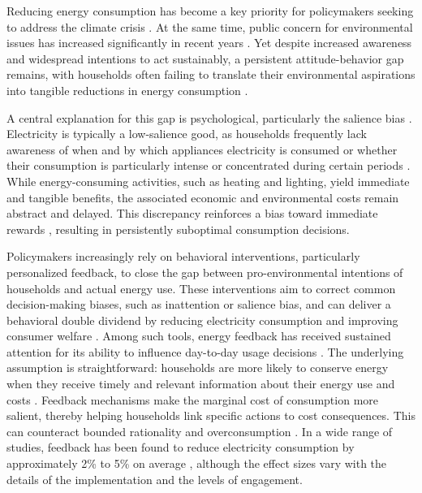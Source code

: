 
Reducing energy consumption has become a key priority for policymakers seeking to address the climate crisis \citep{shuklaClimateChange20222022}. At the same time, public concern for environmental issues has increased significantly in recent years \citep{andreGloballyRepresentativeEvidence2024,milfontTenyearPanelData2021}. Yet despite increased awareness and widespread intentions to act sustainably, a persistent attitude-behavior gap remains, with households often failing to translate their environmental aspirations into tangible reductions in energy consumption \citep{allcottRethinkingRealtimeElectricity2011,zhangExaminingAttitudebehaviorGap2021}.

A central explanation for this gap is psychological, particularly the salience bias \citep{chettySalienceTaxationTheory2009}. Electricity is typically a low-salience good, as households frequently lack awareness of when and by which appliances electricity is consumed or whether their consumption is particularly intense or concentrated during certain periods \citep{alcocerSalienceBiasFramework2024,jessoeKnowledgeLessPower2014,tiefenbeckRealtimeFeedbackPromotes2019}. While energy-consuming activities, such as heating and lighting, yield immediate and tangible benefits, the associated economic and environmental costs remain abstract and delayed. This discrepancy reinforces a bias toward immediate rewards \citep{kahnemanJudgmentUncertaintyHeuristics1982}, resulting in persistently suboptimal consumption decisions. 

Policymakers increasingly rely on behavioral interventions, particularly personalized feedback, to close the gap between pro-environmental intentions of households and actual energy use. These interventions aim to correct common decision-making biases, such as inattention or salience bias, and can deliver a behavioral double dividend by reducing electricity consumption and improving consumer welfare \citep{allcottShortrunLongrunEffects2014}. Among such tools, energy feedback has received sustained attention for its ability to influence day-to-day usage decisions \citep{agarwalReviewResidentialEnergy2023,khannaMulticountryMetaanalysisRole2021}. The underlying assumption is straightforward: households are more likely to conserve energy when they receive timely and relevant information about their energy use and costs \citep{jessoeKnowledgeLessPower2014}. Feedback mechanisms make the marginal cost of consumption more salient, thereby helping households link specific actions to cost consequences. This can counteract bounded rationality and overconsumption \citep{alcocerSalienceBiasFramework2024}.
In a wide range of studies, feedback has been found to reduce electricity consumption by approximately 2\% to 5\% on average \citep{delmasInformationStrategiesEnergy2013,khannaMulticountryMetaanalysisRole2021,mckerracherEnergyConsumptionFeedback2013}, although the effect sizes vary with the details of the implementation and the levels of engagement.

